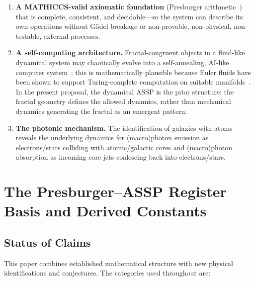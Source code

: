 \documentclass[11pt,a4paper]{article}
\begin{document}
\begin{enumerate}
  \item \textbf{A MATHICCS-valid axiomatic foundation} (Presburger arithmetic~\cite{Presburger1929}) that is complete, consistent, and decidable---so the system can describe its own operations without Gödel breakage or non-provable, non-physical, non-testable, external processes.

  \item \textbf{A self-computing architecture.} Fractal-congruent objects in a fluid-like dynamical system may chaotically evolve into a self-annealing, AI-like computer system~\cite{VonNeumann1966,Wolfram2002}; this is mathematically plausible because Euler fluids have been shown to support Turing-complete computation on suitable manifolds~\cite{Cardona2021,CardonaMirandaPeraltaSalas2021}. In the present proposal, the dynamical ASSP is the prior structure: the fractal geometry defines the allowed dynamics, rather than mechanical dynamics generating the fractal as an emergent pattern.

  \item \textbf{The photonic mechanism.} The identification of galaxies with atoms reveals the underlying dynamics for (macro)photon emission as electrons/stars colliding with atomic/galactic cores and (macro)photon absorption as incoming core jets coalescing back into electrons/stars.

\end{enumerate}


\section{The Presburger--ASSP Register Basis and Derived Constants}
\label{sec:ftc}


\subsection*{Status of Claims}

This paper combines established mathematical structure with new physical
identifications and conjectures. The categories used throughout are:
\end{document}

